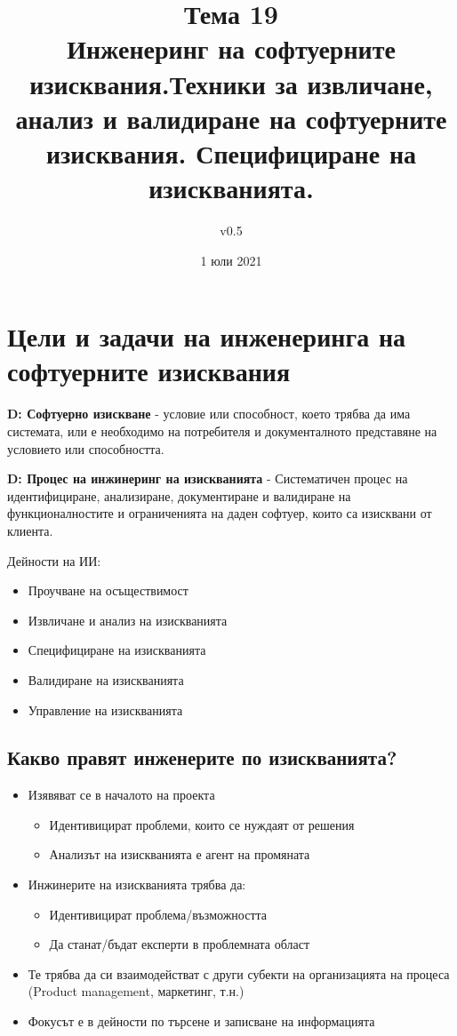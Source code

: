 \documentclass[fleqn,12pt]{article}
\title{Тема 19\\Инженеринг на софтуерните изисквания.Техники за извличане, анализ и валидиране на софтуерните изисквания. Специфициране на изискванията.}
\author{v0.5}
\date{1 юли 2021}
\begin{document}
\maketitle

\tableofcontents

\clearpage

\section{Цели и задачи на инженеринга на софтуерните изисквания}
\textbf{D: Софтуерно изискване} - условие или способност, което трябва да има системата, или е необходимо на потребителя и документалното представяне на условието или способността.

\textbf{D: Процес на инжинеринг на изискванията} - Систематичен процес на идентифициране, анализиране, документиране и валидиране на функционалностите и ограниченията на даден софтуер, които са изисквани от клиента.

Дейности на ИИ:
\begin{itemize}
	\item Проучване на осъществимост
	\item Извличане и анализ на изискванията
	\item Специфициране на изискванията
	\item Валидиране на изискванията
	\item Управление на изискванията
\end{itemize}

\subsection{Какво правят инженерите по изискванията?}

\begin{itemize}
	\item Изявяват се в началото на проекта
	\begin{itemize}
		\item Идентивицират проблеми, които се нуждаят от решения
		\item Анализът на изискванията е агент на промяната
	\end{itemize}

	\item Инжинерите на изискванията трябва да:
	\begin{itemize}
		\item Идентивицират проблема/възможността
		\item Да станат/бъдат експерти в проблемната област
	\end{itemize}

	\item Те трябва да си взаимодействат с други субекти на организацията на процеса (Product management, маркетинг, т.н.)

	\item Фокусът е в дейности по търсене и записване на информацията
\end{itemize}
\end{document}
